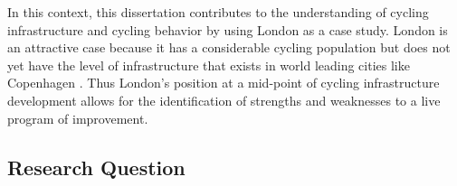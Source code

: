 
In this context, this dissertation contributes to the understanding of cycling infrastructure and cycling behavior by using London as a case study. London is an attractive case because it has a considerable cycling population but does not yet have the level of infrastructure that exists in world leading cities like Copenhagen \parencite{mayor}. Thus London's position at a mid-point of cycling infrastructure development allows for the identification of strengths and weaknesses to a live program of improvement.


\subsection{Research Question}
%


